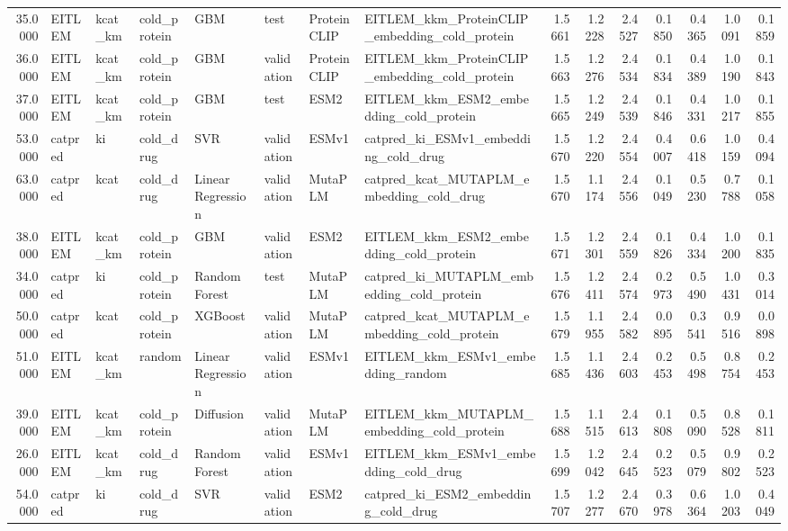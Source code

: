 \begin{tabular}{rlllllllrrrrrrr}
35.0000 & EITLEM & kcat_km & cold_protein & GBM & test & ProteinCLIP & EITLEM_kkm_ProteinCLIP_embedding_cold_protein & 1.5661 & 1.2228 & 2.4527 & 0.1850 & 0.4365 & 1.0091 & 0.1859 \\
36.0000 & EITLEM & kcat_km & cold_protein & GBM & validation & ProteinCLIP & EITLEM_kkm_ProteinCLIP_embedding_cold_protein & 1.5663 & 1.2276 & 2.4534 & 0.1834 & 0.4389 & 1.0190 & 0.1843 \\
37.0000 & EITLEM & kcat_km & cold_protein & GBM & test & ESM2 & EITLEM_kkm_ESM2_embedding_cold_protein & 1.5665 & 1.2249 & 2.4539 & 0.1846 & 0.4331 & 1.0217 & 0.1855 \\
53.0000 & catpred & ki & cold_drug & SVR & validation & ESMv1 & catpred_ki_ESMv1_embedding_cold_drug & 1.5670 & 1.2220 & 2.4554 & 0.4007 & 0.6418 & 1.0159 & 0.4094 \\
63.0000 & catpred & kcat & cold_drug & Linear Regression & validation & MutaPLM & catpred_kcat_MUTAPLM_embedding_cold_drug & 1.5670 & 1.1174 & 2.4556 & 0.1049 & 0.5230 & 0.7788 & 0.1058 \\
38.0000 & EITLEM & kcat_km & cold_protein & GBM & validation & ESM2 & EITLEM_kkm_ESM2_embedding_cold_protein & 1.5671 & 1.2301 & 2.4559 & 0.1826 & 0.4334 & 1.0200 & 0.1835 \\
34.0000 & catpred & ki & cold_protein & Random Forest & test & MutaPLM & catpred_ki_MUTAPLM_embedding_cold_protein & 1.5676 & 1.2411 & 2.4574 & 0.2973 & 0.5490 & 1.0431 & 0.3014 \\
50.0000 & catpred & kcat & cold_protein & XGBoost & validation & MutaPLM & catpred_kcat_MUTAPLM_embedding_cold_protein & 1.5679 & 1.1955 & 2.4582 & 0.0895 & 0.3541 & 0.9516 & 0.0898 \\
51.0000 & EITLEM & kcat_km & random & Linear Regression & validation & ESMv1 & EITLEM_kkm_ESMv1_embedding_random & 1.5685 & 1.1436 & 2.4603 & 0.2453 & 0.5498 & 0.8754 & 0.2453 \\
39.0000 & EITLEM & kcat_km & cold_protein & Diffusion & validation & MutaPLM & EITLEM_kkm_MUTAPLM_embedding_cold_protein & 1.5688 & 1.1515 & 2.4613 & 0.1808 & 0.5090 & 0.8528 & 0.1811 \\
26.0000 & EITLEM & kcat_km & cold_drug & Random Forest & validation & ESMv1 & EITLEM_kkm_ESMv1_embedding_cold_drug & 1.5699 & 1.2042 & 2.4645 & 0.2523 & 0.5079 & 0.9802 & 0.2523 \\
54.0000 & catpred & ki & cold_drug & SVR & validation & ESM2 & catpred_ki_ESM2_embedding_cold_drug & 1.5707 & 1.2277 & 2.4670 & 0.3978 & 0.6364 & 1.0203 & 0.4049 \\

\end{tabular}
